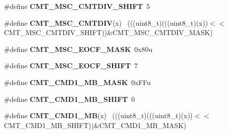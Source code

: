 \begin{DoxyCompactItemize}
\item 
\hypertarget{group___c_m_t___register___masks_gad2d262cf3ba8ccd189bd321219579c52}{}\#define {\bfseries C\+M\+T\+\_\+\+M\+S\+C\+\_\+\+C\+M\+T\+D\+I\+V\+\_\+\+S\+H\+I\+F\+T}~5\label{group___c_m_t___register___masks_gad2d262cf3ba8ccd189bd321219579c52}

\item 
\hypertarget{group___c_m_t___register___masks_ga54610d66d9610fc9d93f47c16a2f052a}{}\#define {\bfseries C\+M\+T\+\_\+\+M\+S\+C\+\_\+\+C\+M\+T\+D\+I\+V}(x)                                            ~(((uint8\+\_\+t)(((uint8\+\_\+t)(x))$<$$<$C\+M\+T\+\_\+\+M\+S\+C\+\_\+\+C\+M\+T\+D\+I\+V\+\_\+\+S\+H\+I\+F\+T))\&C\+M\+T\+\_\+\+M\+S\+C\+\_\+\+C\+M\+T\+D\+I\+V\+\_\+\+M\+A\+S\+K)\label{group___c_m_t___register___masks_ga54610d66d9610fc9d93f47c16a2f052a}

\item 
\hypertarget{group___c_m_t___register___masks_ga1aec1fa9b79d496b3f5f32fab07495a3}{}\#define {\bfseries C\+M\+T\+\_\+\+M\+S\+C\+\_\+\+E\+O\+C\+F\+\_\+\+M\+A\+S\+K}~0x80u\label{group___c_m_t___register___masks_ga1aec1fa9b79d496b3f5f32fab07495a3}

\item 
\hypertarget{group___c_m_t___register___masks_gab505074d349c8d2c800e554a0893f312}{}\#define {\bfseries C\+M\+T\+\_\+\+M\+S\+C\+\_\+\+E\+O\+C\+F\+\_\+\+S\+H\+I\+F\+T}~7\label{group___c_m_t___register___masks_gab505074d349c8d2c800e554a0893f312}

\item 
\hypertarget{group___c_m_t___register___masks_gae4b77d2880f04b69d33cacfe3978042a}{}\#define {\bfseries C\+M\+T\+\_\+\+C\+M\+D1\+\_\+\+M\+B\+\_\+\+M\+A\+S\+K}~0x\+F\+Fu\label{group___c_m_t___register___masks_gae4b77d2880f04b69d33cacfe3978042a}

\item 
\hypertarget{group___c_m_t___register___masks_ga8bbdd2644bc864f959170f9260981476}{}\#define {\bfseries C\+M\+T\+\_\+\+C\+M\+D1\+\_\+\+M\+B\+\_\+\+S\+H\+I\+F\+T}~0\label{group___c_m_t___register___masks_ga8bbdd2644bc864f959170f9260981476}

\item 
\hypertarget{group___c_m_t___register___masks_ga6768033295fb2ea10154824be36cb803}{}\#define {\bfseries C\+M\+T\+\_\+\+C\+M\+D1\+\_\+\+M\+B}(x)                                                  ~(((uint8\+\_\+t)(((uint8\+\_\+t)(x))$<$$<$C\+M\+T\+\_\+\+C\+M\+D1\+\_\+\+M\+B\+\_\+\+S\+H\+I\+F\+T))\&C\+M\+T\+\_\+\+C\+M\+D1\+\_\+\+M\+B\+\_\+\+M\+A\+S\+K)\label{group___c_m_t___register___masks_ga6768033295fb2ea10154824be36cb803}


\end{DoxyCompactItemize}
